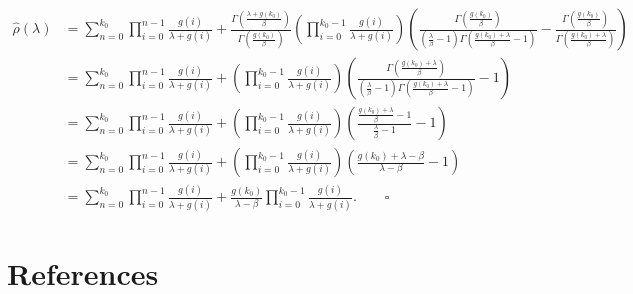 \documentclass[
  sn-basic,
]{sn-jnl}
\theoremstyle{plain}
\theoremstyle{plain}
\theoremstyle{remark}
\begin{document}
\begin{align*}
\hat\rho(\lambda) &= \sum_{n=0}^{k_0}\prod_{i=0}^{n-1}\frac{g(i)}{\lambda+g(i)} + \frac{\Gamma\left(\frac{\lambda+g(k_0)}{\beta}\right)}{\Gamma\left(\frac{g(k_0)}{\beta}\right)}\left(\prod_{i=0}^{k_0-1}\frac{g(i)}{\lambda+g(i)}\right)\left(\frac{\Gamma\left(\frac{g(k_0)}{\beta}\right)}{\left(\frac{\lambda}{\beta}-1\right)\Gamma\left(\frac{g(k_0)+\lambda}{\beta}-1\right)}-\frac{\Gamma\left(\frac{g(k_0)}{\beta}\right)}{\Gamma\left(\frac{g(k_0)+\lambda}{\beta}\right)}\right)\\
&=\sum_{n=0}^{k_0}\prod_{i=0}^{n-1}\frac{g(i)}{\lambda+g(i)} + \left(\prod_{i=0}^{k_0-1}\frac{g(i)}{\lambda+g(i)}\right)\left(\frac{\Gamma\left(\frac{g(k_0)+\lambda}{\beta}\right)}{\left(\frac{\lambda}{\beta}-1\right)\Gamma\left(\frac{g(k_0)+\lambda}{\beta}-1\right)}-1\right)\\
&=\sum_{n=0}^{k_0}\prod_{i=0}^{n-1}\frac{g(i)}{\lambda+g(i)} + \left(\prod_{i=0}^{k_0-1}\frac{g(i)}{\lambda+g(i)}\right)\left(\frac{\frac{g(k_0)+\lambda}{\beta}-1}{\frac{\lambda}{\beta}-1}-1\right)\\
&=\sum_{n=0}^{k_0}\prod_{i=0}^{n-1}\frac{g(i)}{\lambda+g(i)} + \left(\prod_{i=0}^{k_0-1}\frac{g(i)}{\lambda+g(i)}\right)\left(\frac{g(k_0)+\lambda-\beta}{\lambda-\beta}-1\right)\\&=\sum_{n=0}^{k_0}\prod_{i=0}^{n-1}\frac{g(i)}{\lambda+g(i)} + \frac{g(k_0)}{\lambda-\beta}\prod_{i=0}^{k_0-1}\frac{g(i)}{\lambda+g(i)}.\qquad \square
\end{align*}

\newpage

\section*{References}\label{references}

\renewcommand{\bibsection}{}

\end{document}
